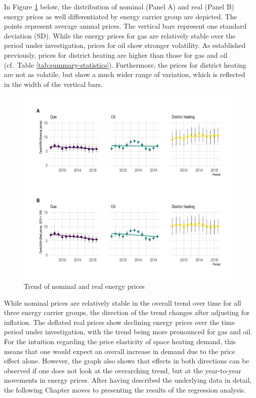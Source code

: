 \documentclass[12pt,twoside]{reedthesis}
\begin{document}
In Figure \ref{fig:price-descriptive-graph} below, the distribution of nominal (Panel A) and real (Panel B) energy prices as well differentiated by energy carrier group are depicted. The points represent average annual prices. The vertical bars represent one standard deviation (SD). While the energy prices for gas are relatively stable over the period under investigation, prices for oil show stronger volatility. As established previously, prices for district heating are higher than those for gas and oil (cf.~Table \ref{tab:summary-statistics}). Furthermore, the prices for district heating are not as volatile, but show a much wider range of variation, which is reflected in the width of the vertical bars.
\begin{figure}

{\centering \includegraphics[width=1\linewidth]{figure/prices_descriptive} 

}

\caption{Trend of nominal and real energy prices}\label{fig:price-descriptive-graph}
\end{figure}
While nominal prices are relatively stable in the overall trend over time for all three energy carrier groups, the direction of the trend changes after adjusting for inflation. The deflated real prices show declining energy prices over the time period under investigation, with the trend being more pronounced for gas and oil. For the intuition regarding the price elasticity of space heating demand, this means that one would expect an overall increase in demand due to the price effect alone. However, the graph also shows that effects in both directions can be observed if one does not look at the overarching trend, but at the year-to-year movements in energy prices. After having described the underlying data in detail, the following Chapter moves to presenting the results of the regression analysis.
\end{document}
